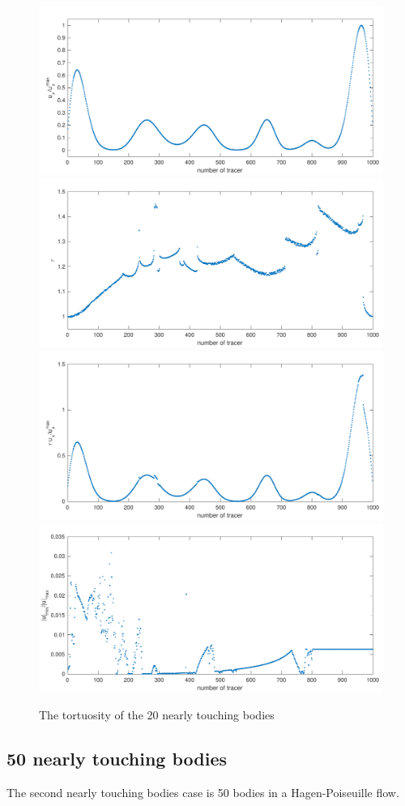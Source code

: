\documentclass[preprint, 10pt]{elsarticle}
\begin{document}
\begin{figure}[H]
\begin{center}
\includegraphics[width = 0.45 \textwidth]{./figs/velocity_loc}
\includegraphics[width = 0.45 \textwidth]{./figs/tort_local}\\

\includegraphics[width = 0.45 \textwidth]{./figs/tortU_local}
\includegraphics[width = 0.45 \textwidth]{./figs/uminDumax}

\caption{\label{fig:Eroding20tort} The tortuosity of the 20 nearly touching bodies}
\end{center}
\end{figure}




\subsection{50 nearly touching bodies}
{\color{red}
The second nearly touching bodies case is 50 bodies in a Hagen-Poiseuille flow.
}
\end{document}

